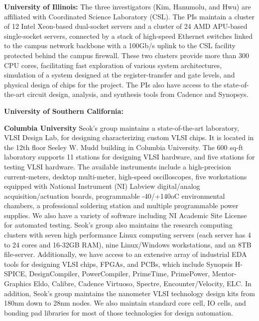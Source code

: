 \noindent
\textbf{University of Illinois:}
The three investigators (Kim, Hanumolu, and Hwu) are affiliated with Coordinated Science Laboratory (CSL). 
The PIs maintain a cluster of 12 Intel Xeon-based dual-socket servers and a cluster of 24 AMD APU-based single-socket servers, connected by a stack of high-speed Ethernet switches linked to the campus network backbone with a 100Gb/s uplink to the CSL facility protected behind the campus firewall.
These two clusters provide more than 300 CPU cores, facilitating fast exploration of various system architectures, simulation of a system designed at the register-transfer and gate levels, and physical design of chips for the project.
The PIs also have access to the state-of-the-art circuit design, analysis, and synthesis tools from Cadence and Synopsys.

\noindent
\textbf{University of Southern California:}

\noindent
\textbf{Columbia University}   
Seok’s group maintains a state-of-the-art laboratory, VLSI Design Lab, for designing characterizing custom VLSI chips. It is located in the 12th floor Seeley W. Mudd building in Columbia University. The 600 sq-ft laboratory supports 11 stations for designing VLSI hardware, and five stations for testing VLSI hardware. The available instruments include a high-precision current-meters, desktop multi-meter, high-speed oscilloscopes, five workstations equipped with National Instrument (NI) Labview digital/analog acquisition/actuation boards, programmable -40/+140oC environmental chambers, a professional soldering station and multiple programmable power supplies. We also have a variety of software including NI Academic Site License for automated testing. 
Seok’s group also maintains the research computing clusters with seven high performance Linux computing servers (each server has 4 to 24 cores and 16-32GB RAM), nine Linux/Windows workstations, and an 8TB file-server. Additionally, we have access to an extensive array of industrial EDA tools for designing VLSI chips, FPGAs, and PCBs, which include Synopsis H-SPICE, DesignCompiler, PowerCompiler, PrimeTime, PrimePower, Mentor-Graphics Eldo, Calibre, Cadence Virtuoso, Spectre, Encounter/Velocity, ELC. In addition, Seok’s group maintains the nanometer VLSI technology design kits from 180nm down to 28nm nodes. We also maintain standard core cell, IO cells, and bonding pad libraries for most of those technologies for design automation. 

